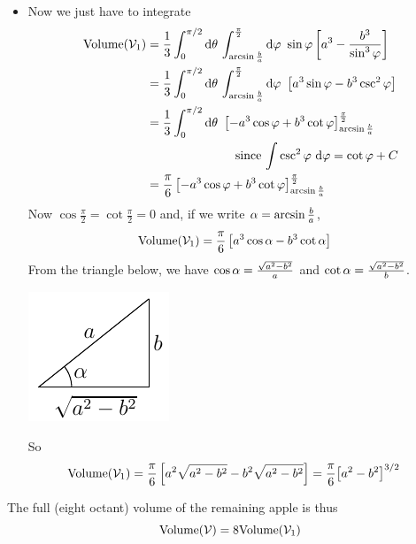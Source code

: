 \begin{eg}
\begin{itemize}
\item
Now we just have to integrate
\begin{align*}
\text{Volume}(\cV_1)
&=\frac{1}{3}\int_0^{\pi/2}\dee{\theta}\,
         \int_{\arcsin\frac{b}{a}}^{\frac{\pi}{2}}  \dee{\varphi}\ 
           \sin\varphi \left[a^3-\frac{b^3}{\sin^3\varphi}\right]\\
&=\frac{1}{3}\int_0^{\pi/2}\dee{\theta}\,
         \int_{\arcsin\frac{b}{a}}^{\frac{\pi}{2}}  \dee{\varphi}\ 
            \left[a^3 \sin\varphi- b^3\csc^2\varphi\right]\\
&=\frac{1}{3}\int_0^{\pi/2}\dee{\theta}\ 
            \left[-a^3 \cos\varphi + b^3\cot\varphi\right]
                        _{\arcsin\frac{b}{a}}^{\frac{\pi}{2}} \\
&\hskip1in\text{since $\int \csc^2\varphi\ \dee{\varphi} =\cot\varphi+C$} \\
&=\frac{\pi}{6}
            \left[-a^3 \cos\varphi + b^3\cot\varphi\right]
                        _{\arcsin\frac{b}{a}}^{\frac{\pi}{2}} 
\end{align*}
Now $\cos\frac{\pi}{2} = \cot\frac{\pi}{2}=0$ and, if we write 
$\alpha=\arcsin\frac{b}{a}$,
\begin{align*}
\text{Volume}(\mathcal{V}_1)
&=\frac{\pi}{6}
            \left[a^3 \cos\alpha - b^3\cot\alpha\right]
\end{align*}
From the triangle below, we have
$\cos\alpha =\frac{\sqrt{a^2-b^2}}{a} $ and $\cot\alpha=\frac{\sqrt{a^2-b^2}}{b}$.
\begin{efig}
\begin{center}
    \includegraphics{triangleApple.pdf}
\end{center}
\end{efig}
So\begin{align*}
\text{Volume}(\mathcal{V}_1)
&=\frac{\pi}{6}
            \left[a^2 \sqrt{a^2-b^2} - b^2\sqrt{a^2-b^2}\right]
=\frac{\pi}{6}\big[a^2-b^2\big]^{3/2}
\end{align*}
\end{itemize}
The full (eight octant) volume of the remaining apple is thus
\begin{equation*}
\text{Volume}(\cV)
=8 \text{Volume}(\cV_1)

\end{equation*}
\end{eg}
